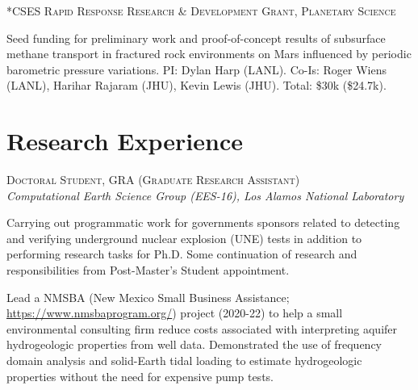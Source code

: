 \documentclass[11pt, letterpaper]{article}
\newcommand{\years}[1]{\marginnote{\scriptsize #1}}
\begin{document}
\years{2020}\textsc{*CSES Rapid Response Research \& Development Grant, Planetary
Science}
\begin{adjustwidth}{5pt}{0pt}
	Seed funding for preliminary work and proof-of-concept results of
	subsurface methane transport in fractured rock environments on Mars
	influenced by periodic barometric pressure variations.
	PI: Dylan Harp (LANL). Co-Is: Roger Wiens (LANL), Harihar Rajaram (JHU),
	Kevin Lewis (JHU). Total: \$30k (\$24.7k). %
\end{adjustwidth}


\section*{Research Experience}
\noindent
\years{2020 - pres.}\textsc{Doctoral Student, GRA (Graduate Research Assistant)}\\
\textit{Computational Earth Science Group (EES-16), Los Alamos National Laboratory}
\begin{adjustwidth}{5pt}{0pt}
	Carrying out programmatic work for governments sponsors related to detecting
	and verifying underground nuclear explosion (UNE) tests in addition to
	performing research tasks for Ph.D. Some  continuation of research and
	responsibilities from Post-Master's Student appointment.
	
	Lead a NMSBA (New Mexico Small Business Assistance;
	\href{https://www.nmsbaprogram.org/}{https://www.nmsbaprogram.org/})
	project (2020-22) to help a small environmental consulting firm reduce
	costs associated with interpreting aquifer hydrogeologic properties from
	well data.  Demonstrated the use of frequency domain analysis and
	solid-Earth tidal loading to estimate hydrogeologic properties without the
	need for expensive pump tests. 
\end{adjustwidth}
\end{document}
